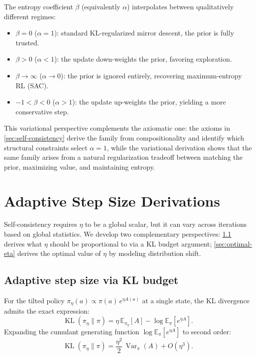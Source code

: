\documentclass{article}
\theoremstyle{plain}
\theoremstyle{definition}
\theoremstyle{remark}
\newcommand{\E}{\mathbb{E}}
\DeclareMathOperator{\KL}{KL}
\DeclareMathOperator{\Var}{Var}
\begin{document}
The entropy coefficient $\beta$ (equivalently $\alpha$) interpolates between qualitatively different regimes:
\begin{itemize}[nosep]
  \item $\beta = 0$ ($\alpha = 1$): standard KL-regularized mirror descent, the prior is fully trusted.
  \item $\beta > 0$ ($\alpha < 1$): the update down-weights the prior, favoring exploration.
  \item $\beta \to \infty$ ($\alpha \to 0$): the prior is ignored entirely, recovering maximum-entropy RL (SAC).
  \item $-1 < \beta < 0$ ($\alpha > 1$): the update up-weights the prior, yielding a more conservative step.
\end{itemize}

This variational perspective complements the axiomatic one: the axioms in \cref{sec:self-consistency} derive the family from compositionality and identify which structural constraints select $\alpha = 1$, while the variational derivation shows that the same family arises from a natural regularization tradeoff between matching the prior, maximizing value, and maintaining entropy.

\section{Adaptive Step Size Derivations}
\label{app:adaptive-eta}

Self-consistency requires $\eta$ to be a global scalar, but it can vary across iterations based on global statistics. We develop two complementary perspectives: \cref{sec:kl-budget} derives what $\eta$ should be proportional to via a KL budget argument; \cref{sec:optimal-eta} derives the optimal value of $\eta$ by modeling distribution shift.

\subsection{Adaptive step size via KL budget}
\label{sec:kl-budget}

For the tilted policy $\pi_\eta(a) \propto \pi(a)\,e^{\eta A(a)}$ at a single state, the KL divergence admits the exact expression:
\[
  \KL(\pi_\eta \| \pi) = \eta\,\E_{\pi_\eta}[A] - \log \E_\pi[e^{\eta A}].
\]
Expanding the cumulant generating function $\log \E_\pi[e^{\eta A}]$ to second order:
\begin{equation}\label{eq:kl-expansion}
  \KL(\pi_\eta \| \pi) = \frac{\eta^2}{2}\,\Var_\pi(A) + O(\eta^3).
\end{equation}
\end{document}
